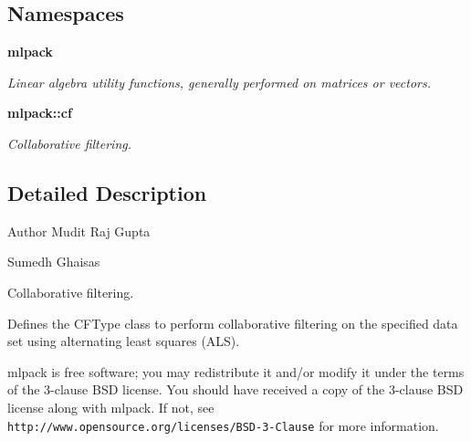 \subsection*{Namespaces}
\begin{DoxyCompactItemize}
\item 
 \textbf{ mlpack}
\begin{DoxyCompactList}\small\item\em Linear algebra utility functions, generally performed on matrices or vectors. \end{DoxyCompactList}\item 
 \textbf{ mlpack\+::cf}
\begin{DoxyCompactList}\small\item\em Collaborative filtering. \end{DoxyCompactList}\end{DoxyCompactItemize}


\subsection{Detailed Description}
\begin{DoxyAuthor}{Author}
Mudit Raj Gupta 

Sumedh Ghaisas
\end{DoxyAuthor}
Collaborative filtering.

Defines the C\+F\+Type class to perform collaborative filtering on the specified data set using alternating least squares (A\+LS).

mlpack is free software; you may redistribute it and/or modify it under the terms of the 3-\/clause B\+SD license. You should have received a copy of the 3-\/clause B\+SD license along with mlpack. If not, see {\tt http\+://www.\+opensource.\+org/licenses/\+B\+S\+D-\/3-\/\+Clause} for more information. 